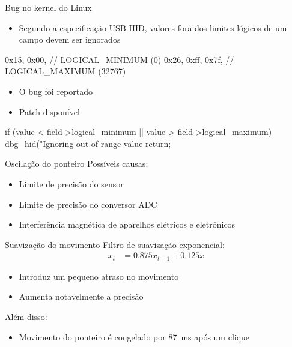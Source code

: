 \documentclass{beamer}
\begin{document}
\begin{frame}[fragile]{Bug no kernel do Linux}
	\begin{itemize}
		\pause
		\item Segundo a especificação USB HID, valores fora dos limites lógicos de um campo devem ser ignorados
	\end{itemize}
	\pause
	\begin{ccode}[numbers=none]
	0x15, 0x00,        //     LOGICAL_MINIMUM (0)
	0x26, 0xff, 0x7f,  //     LOGICAL_MAXIMUM (32767)
	\end{ccode}
	\begin{itemize}
		\pause
		\item O bug foi reportado
		\pause
		\item Patch disponível
	\end{itemize}
	\begin{ccode}[numbers=none]
	if (value < field->logical_minimum ||
	    value > field->logical_maximum)
	{
	    dbg_hid("Ignoring out-of-range value %
	    return;
	}
	\end{ccode}
\end{frame}


\begin{frame}{Oscilação do ponteiro}
	Possíveis causas:
	\begin{itemize}
		\pause
		\item Limite de precisão do sensor
		\pause
		\item Limite de precisão do conversor ADC
		\pause
		\item Interferência magnética de aparelhos elétricos e eletrônicos
	\end{itemize}
\end{frame}


\begin{frame}{Suavização do movimento}
	\pause
	Filtro de suavização exponencial:
	\pause
	\begin{align*}
		x_t & = 0.875 x_{t-1} + 0.125 x
	\end{align*}
	\begin{itemize}
		\pause
		\item Introduz um pequeno atraso no movimento
		\pause
		\item Aumenta notavelmente a precisão
	\end{itemize}
	\pause
	\bigskip
	Além disso:
	\begin{itemize}
		\pause
		\item Movimento do ponteiro é congelado por \qty{87}{\milli\second} após um clique
	\end{itemize}
\end{frame}
\end{document}
